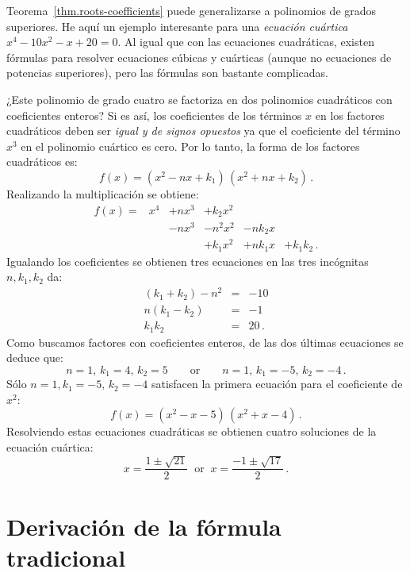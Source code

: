\begin{example}
Teorema~\ref{thm.roots-coefficients} puede generalizarse a polinomios de grados superiores. He aquí un ejemplo interesante para una \emph{ecuación cuártica} $x^4-10x^2-x+20=0$. Al igual que con las ecuaciones cuadráticas, existen fórmulas para resolver ecuaciones cúbicas y cuárticas (aunque no ecuaciones de potencias superiores), pero las fórmulas son bastante complicadas.

¿Este polinomio de grado cuatro se factoriza en dos polinomios cuadráticos con coeficientes enteros? Si es así, los coeficientes de los términos $x$ en los factores cuadráticos deben ser \emph{igual y de signos opuestos} ya que el coeficiente del término $x^3$ en el polinomio cuártico es cero. Por lo tanto, la forma de los factores cuadráticos es:
\[
f(x) = (x^2 - nx + k_1)\, (x^2 + nx + k_2)\,.
\]
Realizando la multiplicación se obtiene:
\[
\renewcommand{\arraystretch}{1.1}
\begin{array}{rrrrrr}
f(x) = &x^4 & + nx^3 & + k_2 x^2\\
&& -nx^3 &- n^2x^2 &-nk_2x\\
&&&+k_1x^2 &+ nk_1x &+ k_1k_2\,.
\end{array}
\]
Igualando los coeficientes se obtienen tres ecuaciones en las tres incógnitas $n,k_1,k_2$ da:
\begin{eqnarray*}
(k_1+k_2)-n^2 &=& -10\\
n(k_1-k_2) &=& -1\\
k_1k_2 &=& 20\,.
\end{eqnarray*}
Como buscamos factores con coeficientes enteros, de las dos últimas ecuaciones se deduce que:
\[
n=1,\,k_1=4,\,k_2=5  \quad\quad\textrm{or} \quad\quad n=1,\,k_1=-5,\, k_2=-4\,.
\]
Sólo $n=1,k_1=-5,\, k_2=-4$ satisfacen la primera ecuación para el coeficiente de $x^2$:
\[
f(x) = (x^2 - x - 5)\, (x^2 + x - 4)\,.
\]
Resolviendo estas ecuaciones cuadráticas se obtienen cuatro soluciones de la ecuación cuártica:
\[
x = \frac{1\pm\sqrt{21}}{2}  \;\;\textrm{or} \;\; x= \frac{-1\pm\sqrt{17}}{2} \,.
\]
\end{example}

\section{Derivación de la fórmula tradicional}\label{s.general}

